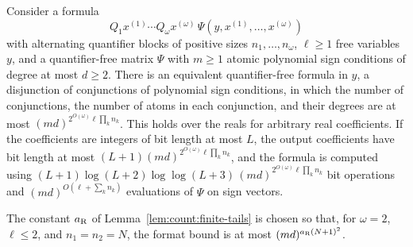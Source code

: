 \begin{theorem}\label{thm:count:renegar}
Consider a formula
\[
 Q_1x^{(1)}\cdots Q_\omega x^{(\omega)}\,
 \Psi(y,x^{(1)},\dots,x^{(\omega)})
\]
with alternating quantifier blocks of positive sizes $n_1,\dots,n_\omega$,
$\ell\ge1$ free variables $y$, and a quantifier-free matrix $\Psi$ with
$m\ge1$ atomic polynomial
sign conditions of degree at most $d\ge2$. There is an equivalent
quantifier-free formula in $y$, a disjunction of conjunctions of polynomial
sign conditions, in which the number of conjunctions, the number of atoms in
each conjunction, and their degrees are at most
$(md)^{2^{O(\omega)}\ell\prod_kn_k}$. This holds over the reals for arbitrary
real coefficients. If the coefficients are integers of bit length at most
$L$, the output coefficients have bit length at most
$(L+1)(md)^{2^{O(\omega)}\ell\prod_kn_k}$, and the formula is computed using
$(L+1)\log(L+2)\log\log(L+3)\,(md)^{2^{O(\omega)}\ell\prod_kn_k}$ bit operations and
$(md)^{O(\ell+\sum_kn_k)}$ evaluations of $\Psi$ on sign vectors.
\end{theorem}

The constant $a_{\rm R}$ of Lemma~\ref{lem:count:finite-tails} is chosen so
that, for $\omega=2$, $\ell\le2$, and $n_1=n_2=N$, the format bound is at most
$(md)^{a_{\rm R}(N+1)^2}$.

